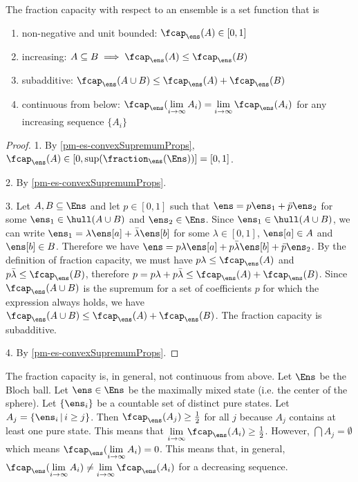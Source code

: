 \begin{mathSection}
	\begin{prop}
		The fraction capacity with respect to an ensemble is a set function that is
		\begin{enumerate}
			\item non-negative and unit bounded: $\fcap_{\ens}(A) \in [0,1]$
			\item increasing: $A \subseteq B \implies \fcap_{\ens}(A) \leq \fcap_{\ens}(B)$
			\item subadditive: $\fcap_{\ens}(A \cup B) \leq \fcap_{\ens}(A) + \fcap_{\ens}(B)$
			\item continuous from below: $\fcap_{\ens}(\lim\limits_{i \to \infty} A_i) = \lim\limits_{i \to \infty} \fcap_{\ens}(A_i)$ for any increasing sequence $\{A_i\}$
		\end{enumerate}
	\end{prop}
	
	\begin{proof}
		1. By \ref{pm-es-convexSupremumProps}, $\fcap_{\ens}(A) \in [0, \sup(\fraction_{\ens}(\Ens))] = [0,1]$. 
	
		2. By \ref{pm-es-convexSupremumProps}.
		
		3. Let $A, B \subseteq \Ens$ and let $p \in [0,1]$ such that $\ens = p \ens_1 + \bar{p} \ens_2$ for some $\ens_1 \in \hull(A \cup B)$ and $\ens_2 \in \Ens$. Since $\ens_1 \in \hull(A \cup B)$, we can write $\ens_1 = \lambda \ens[a] + \bar{\lambda} \ens[b]$ for some $\lambda \in [0,1]$, $\ens[a] \in A$ and $\ens[b] \in B$. Therefore we have $\ens = p \lambda \ens[a] + p \bar{\lambda} \ens[b] + \bar{p} \ens_2$. By the definition of fraction capacity, we must have $p\lambda \leq \fcap_{\ens}(A)$ and $p\bar{\lambda} \leq \fcap_{\ens}(B)$, therefore $p = p\lambda + p\bar{\lambda} \leq \fcap_{\ens}(A) + \fcap_{\ens}(B)$. 	Since $\fcap_{\ens}(A \cup B)$ is the supremum for a set of coefficients $p$ for which the expression always holds, we have $\fcap_{\ens}(A \cup B) \leq \fcap_{\ens}(A) + \fcap_{\ens}(B)$. The fraction capacity is subadditive.
	
		4. By \ref{pm-es-convexSupremumProps}.
	\end{proof}
	

\begin{remark}
	The fraction capacity is, in general, not continuous from above. Let $\Ens$ be the Bloch ball. Let $\ens \in \Ens$ be the maximally mixed state (i.e. the center of the sphere). Let $\{\ens_i\}$ be a countable set of distinct pure states. Let $A_j = \{ \ens_i \, | \, i \geq j\}$. Then $\fcap_{\ens}(A_j) \geq \frac{1}{2}$ for all $j$ because $A_j$ contains at least one pure state. This means that $\lim\limits_{i \to \infty} \fcap_{\ens}(A_i) \geq \frac{1}{2}$. However, $\bigcap A_j = \emptyset$ which means $\fcap_{\ens}(\lim\limits_{i \to \infty} A_i) = 0$. This means that, in general, $\fcap_{\ens}(\lim\limits_{i \to \infty} A_i) \neq \lim\limits_{i \to \infty} \fcap_{\ens}(A_i)$ for a decreasing sequence.
\end{remark}
	
\end{mathSection}

